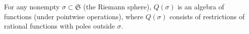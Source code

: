 For any nonempty $\sigma \subset \mathfrak{S}$ (the Riemann sphere), $Q(\sigma)$ is an algebra of functions (under pointwise operations), where $Q(\sigma)$ consists of restrictions of rational functions with poles outside $\sigma$.
